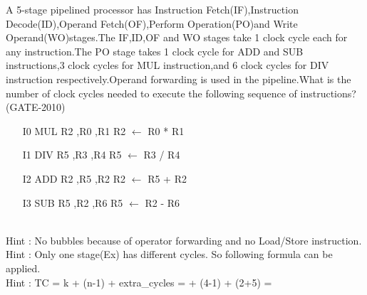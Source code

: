 \begin{questyle}
  \question  A 5-stage pipelined processor has Instruction Fetch(IF),Instruction Decode(ID),Operand
             Fetch(OF),Perform Operation(PO)and Write Operand(WO)stages.The IF,ID,OF and WO stages
             take 1 clock cycle each for any instruction.The PO stage takes 1 clock cycle for ADD
             and SUB instructions,3 clock cycles for MUL instruction,and 6 clock cycles for DIV
             instruction respectively.Operand forwarding is used in the pipeline.What is the number
             of clock cycles needed to execute the following sequence of instructions?  (GATE-2010)

  \begin{enumerate}
    \item[I0] \quad MUL R2 ,R0 ,R1 \qquad R2 \(\leftarrow\) R0 * R1
    \item[I1] \quad DIV R5 ,R3 ,R4  \qquad R5 \(\leftarrow\) R3 / R4
    \item[I2] \quad ADD R2 ,R5 ,R2 \qquad R2 \(\leftarrow\) R5 + R2
    \item[I3] \quad SUB R5 ,R2 ,R6 \qquad R5 \(\leftarrow\) R2 - R6
  \end{enumerate}

  \begin{oneparchoices}
  \end{oneparchoices} \\
  Hint : No bubbles because of operator forwarding and no Load/Store instruction. \\
  Hint : Only one stage(Ex) has different cycles. So following formula can be applied.\\
  Hint : TC = \; k + (n-1) + extra\_cycles =  + (4-1) + (2+5) = 
\end{questyle}


